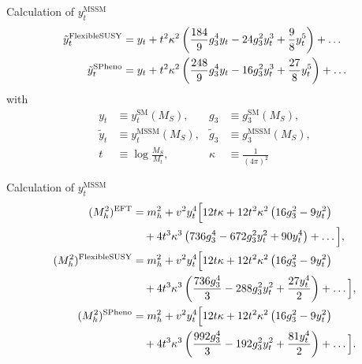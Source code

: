 \documentclass[hyperref={pdfpagelabels=false},ngerman]{beamer}
\newcommand{\SM}{\ensuremath{\text{SM}}}
\begin{document}
\newcommand{\gs}{\hat{g}_3}
\newcommand{\gsMSSM}{\bar{g}_3}
\newcommand{\ytlow}{\hat{y}_t}
\newcommand{\ytMSSMlow}{\bar{y}_t}
\newcommand{\vlow}{\hat{v}}
\newcommand{\vMSSM}{\bar{v}}
\newcommand{\gshigh}{{g}_3}
\newcommand{\gsMSSMhigh}{\tilde{g}_3}
\newcommand{\ythigh}{y_t}
\newcommand{\ytMSSMhigh}{\tilde{y}_t}
\newcommand{\vhigh}{v}
\newcommand{\vMSSMhigh}{\tilde{v}}
\newcommand{\lambdalow}{\hat{\lambda}}
\newcommand{\lambdahigh}{{\lambda}}

\newcommand{\kappaL}{\kappa}

\begin{frame}{Calculation of $y_t^{\text{MSSM}}$}
  \begin{align*}
    \ytMSSMhigh^{\text{\FS}} &= 
    \ythigh +
    t^2\kappaL^2 \left(\frac{184}{9} \gshigh^4 \ythigh -24 \gshigh^2
      \ythigh^3 
      +\frac{9}{8} \ythigh^5 \right) 
    +\ldots\\
    \ytMSSMhigh^{\text{\SPheno}} &= 
    \ythigh +
    t^2 \kappaL^2 \left(\frac{248}{9} \gshigh^4 \ythigh-16 \gshigh^2
      \ythigh^3
      +\frac{27}{8} \ythigh^5\right) 
    +\ldots
  \end{align*}
  with
  \begin{align*}
    y_t &\equiv y_t^\SM(M_S), & g_3 &\equiv g_3^\SM(M_S), \\
    \tilde{y}_t &\equiv y_t^\text{MSSM}(M_S), & \tilde{g}_3 &\equiv g_3^\text{MSSM}(M_S), \\
    t &\equiv \log\frac{M_S}{M_t}, & \kappaL &\equiv \frac{1}{(4 \pi)^2}
  \end{align*}
\end{frame}

\begin{frame}{Calculation of $y_t^{\text{MSSM}}$}
  \begin{align*}
    (M_h^2)^{\text{EFT}}&=
    m_h^2
    + \vhigh^2 
    \ythigh^4\Big[12 t \kappaL
    +12 t^2 \kappaL^2 
    \left(16 \gshigh^2 - 9\ythigh^2 \right)
    \\&\quad{}
    +
    4 t^3\kappaL^3  \left(736 \gshigh^4-672 \gshigh^2 \ythigh^2+90
      \ythigh^4\right) 
    +\ldots\Big],
    \\
    (M_h^2)^{\text{\FS}}&=
    m_h^2
    + \vhigh^2 
    \ythigh^4\Big[12 t \kappaL
    +12 t^2 \kappaL^2 
    \left(16 \gshigh^2 - 9\ythigh^2 \right)
    \\&\quad{}
    +4 t^3\kappaL^3 \left(\frac{736 \gshigh^4}{3}-288 \gshigh^2
      \ythigh^2+\frac{27 \ythigh^4}{2}\right)
    +\ldots\Big],
    \\
    (M_h^2)^{\text{\SPheno}}&=
    m_h^2
    + \vhigh^2 
    \ythigh^4\Big[12 t \kappaL
    +12 t^2 \kappaL^2 
    \left(16 \gshigh^2 - 9\ythigh^2 \right)
    \\&\quad{}
    +4 t^3\kappaL^3 \left(\frac{992 \gshigh^4}{3}-192 \gshigh^2
      \ythigh^2+\frac{81 \ythigh^4}{2}\right)
    +\ldots\Big].
  \end{align*}
\end{frame}
\end{document}
